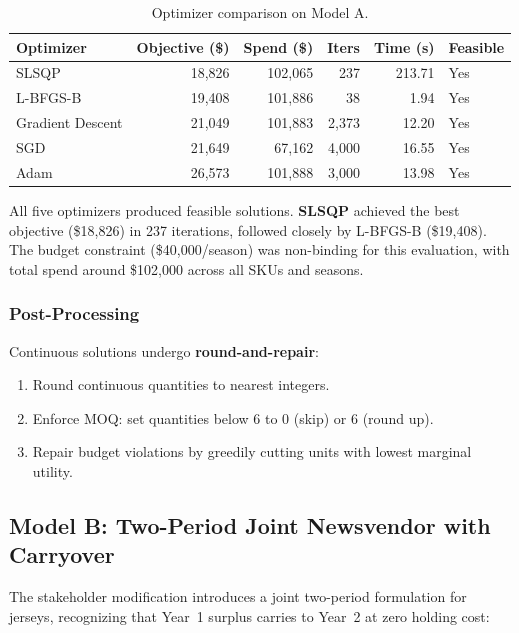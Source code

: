 \documentclass[11pt, letterpaper]{article}
\begin{document}
\begin{table}[H]
\centering
\caption{Optimizer comparison on Model A.}
\label{tab:optimizer-comparison}
\begin{tabular}{@{}lrrrrl@{}}
\toprule
\textbf{Optimizer} & \textbf{Objective (\$)} & \textbf{Spend (\$)} & \textbf{Iters} & \textbf{Time (s)} & \textbf{Feasible} \\
\midrule
SLSQP        & 18,826 & 102,065 & 237   & 213.71 & Yes \\
L-BFGS-B     & 19,408 & 101,886 & 38    & 1.94 & Yes \\
Gradient Descent & 21,049 & 101,883 & 2,373 & 12.20 & Yes \\
SGD          & 21,649 & 67,162  & 4,000 & 16.55 & Yes \\
Adam         & 26,573 & 101,888 & 3,000 & 13.98 & Yes \\
\bottomrule
\end{tabular}
\end{table}

All five optimizers produced feasible solutions. \textbf{SLSQP} achieved the best objective (\$18,826) in 237 iterations, followed closely by L-BFGS-B (\$19,408). The budget constraint (\$40,000/season) was non-binding for this evaluation, with total spend around \$102,000 across all SKUs and seasons.

\subsubsection{Post-Processing}

Continuous solutions undergo \textbf{round-and-repair}:
\begin{enumerate}[nosep]
    \item Round continuous quantities to nearest integers.
    \item Enforce MOQ: set quantities below 6 to 0 (skip) or 6 (round up).
    \item Repair budget violations by greedily cutting units with lowest marginal utility.
\end{enumerate}

\subsection{Model B: Two-Period Joint Newsvendor with Carryover}

The stakeholder modification introduces a joint two-period formulation for jerseys, recognizing that Year~1 surplus carries to Year~2 at zero holding cost:
\end{document}
